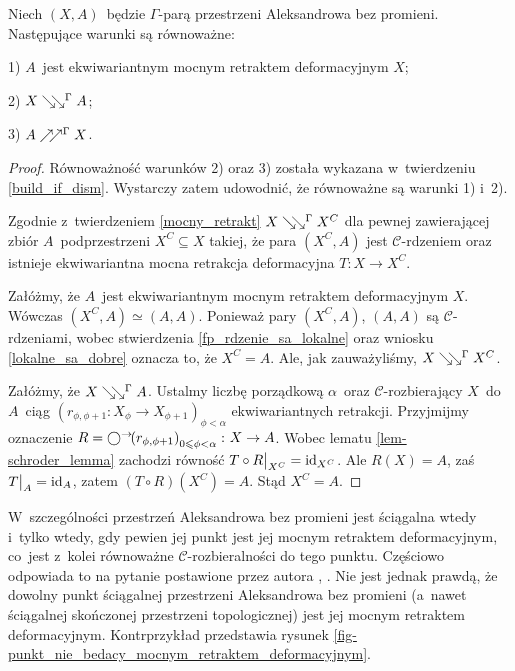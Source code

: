 \begin{wn}\label{wn-charakteryzacja-mocnych-retraktow-deformacyjnych}
Niech $(X,A)$~będzie $\Gamma$-parą przestrzeni Aleksandrowa bez promieni. Następujące warunki są równoważne:
\begin{compactenum}
\item[1)] $A$~jest ekwiwariantnym mocnym retraktem deformacyjnym $X$;
\item[2)] $X\searrow\!\!\searrow^{\Gamma} A$;
\item[3)] $A\nearrow\!\!\nearrow^\Gamma X$.
\end{compactenum}
\end{wn}
\begin{proof}
Równoważność warunków 2) oraz 3) została wykazana w~twierdzeniu \ref{build_if_dism}. Wystarczy zatem udowodnić, że równoważne są warunki 1) i~2).

Zgodnie z~twierdzeniem \ref{mocny_retrakt} $X\searrow\!\!\searrow^\Gamma X^C$ dla pewnej zawierającej zbiór $A$~podprzestrzeni $X^C\subseteq X$ takiej, że para $\left(X^C,A\right)$ jest $\mathcal{C}$-rdzeniem oraz istnieje ekwiwariantna mocna retrakcja deformacyjna $T\colon X\to X^C$.

Załóżmy, że $A$~jest ekwiwariantnym mocnym retraktem deformacyjnym $X$. Wówczas $(X^C,A)\simeq (A,A)$. Ponieważ pary $\left(X^C,A\right)$, $(A,A)$ są $\mathcal{C}$-rdzeniami, wobec stwierdzenia \ref{fp_rdzenie_sa_lokalne} oraz wniosku \ref{lokalne_sa_dobre} oznacza to, że $X^C=A$. Ale, jak zauważyliśmy, $X\searrow\!\!\searrow^\Gamma X^C$.

Załóżmy, że $X\searrow\!\!\searrow^\Gamma A$. Ustalmy liczbę porządkową $\alpha$~oraz \mbox{$\mathcal{C}$-rozbierający} $X$~do $A$~ciąg $\left(r_{\phi,\phi+1}\colon X_\phi\to X_{\phi+1}\right)_{\phi<\alpha}$ ekwiwariantnych retrakcji. Przyjmijmy oznaczenie $R=\bigcirc^\rightarrow\!\!\left(r_{\phi,\phi+1}\right)_{0\leqslant\phi<\alpha}\colon X\to A$. Wobec lematu \ref{lem-schroder_lemma} zachodzi równość $T\circ R\big|_{X^C}=\operatorname{id}_{X^C}$. Ale $R(X)=A$, zaś $T\big|_A=\operatorname{id}_A$, zatem $(T\circ R)\left(X^C\right)= A$. Stąd $X^C=A$.
\end{proof}
W~szczególności przestrzeń Aleksandrowa bez promieni jest ściągalna wtedy i~tylko wtedy, gdy pewien jej punkt jest jej mocnym retraktem deformacyjnym, co~jest z~kolei równoważne $\mathcal{C}$-rozbieralności do tego punktu. Częściowo odpowiada to na pytanie postawione przez autora \cite[Problem 5]{Kukiela10a}, \cite[Question 4]{Kukiela10}.
Nie jest jednak prawdą, że dowolny punkt ściągalnej przestrzeni Aleksandrowa bez promieni (a~nawet ściągalnej skończonej przestrzeni topologicznej) jest jej mocnym retraktem deformacyjnym. Kontrprzykład przedstawia rysunek \ref{fig-punkt_nie_bedacy_mocnym_retraktem_deformacyjnym}.

